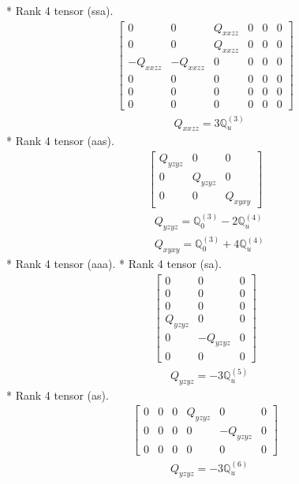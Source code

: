 \documentclass[fleqn,8pt,landscape]{jsarticle}
\begin{document}
* Rank 4 tensor (ssa).
\begin{align*}
\begin{bmatrix} 0 & 0 & Q_{xxzz} & 0 & 0 & 0 \\ 0 & 0 & Q_{xxzz} & 0 & 0 & 0 \\ - Q_{xxzz} & - Q_{xxzz} & 0 & 0 & 0 & 0 \\ 0 & 0 & 0 & 0 & 0 & 0 \\ 0 & 0 & 0 & 0 & 0 & 0 \\ 0 & 0 & 0 & 0 & 0 & 0 \end{bmatrix}
\end{align*}
\begin{align*}
& Q_{xxzz} = 3 \mathbb{Q}_{u}^{(3)}
\end{align*}
* Rank 4 tensor (aas).
\begin{align*}
\begin{bmatrix} Q_{yzyz} & 0 & 0 \\ 0 & Q_{yzyz} & 0 \\ 0 & 0 & Q_{xyxy} \end{bmatrix}
\end{align*}
\begin{align*}
& Q_{yzyz} = \mathbb{Q}_{0}^{(3)} - 2 \mathbb{Q}_{u}^{(4)} \\
& Q_{xyxy} = \mathbb{Q}_{0}^{(3)} + 4 \mathbb{Q}_{u}^{(4)}
\end{align*}
* Rank 4 tensor (aaa).
* Rank 4 tensor (sa).
\begin{align*}
\begin{bmatrix} 0 & 0 & 0 \\ 0 & 0 & 0 \\ 0 & 0 & 0 \\ Q_{yzyz} & 0 & 0 \\ 0 & - Q_{yzyz} & 0 \\ 0 & 0 & 0 \end{bmatrix}
\end{align*}
\begin{align*}
& Q_{yzyz} = - 3 \mathbb{Q}_{u}^{(5)}
\end{align*}
* Rank 4 tensor (as).
\begin{align*}
\begin{bmatrix} 0 & 0 & 0 & Q_{yzyz} & 0 & 0 \\ 0 & 0 & 0 & 0 & - Q_{yzyz} & 0 \\ 0 & 0 & 0 & 0 & 0 & 0 \end{bmatrix}
\end{align*}
\begin{align*}
& Q_{yzyz} = - 3 \mathbb{Q}_{u}^{(6)}
\end{align*}
\end{document}
